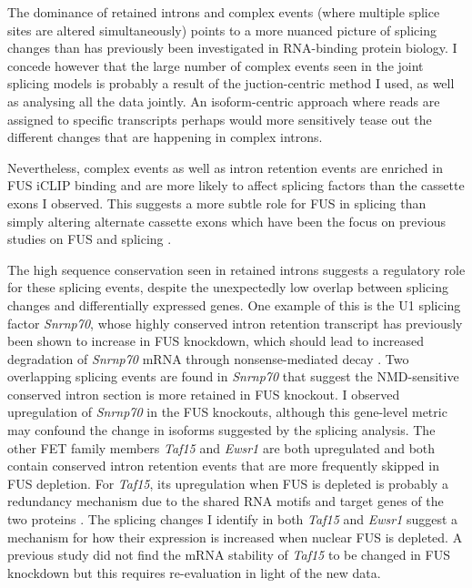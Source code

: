 The dominance of retained introns and complex events (where multiple splice sites are altered simultaneously) points to a more nuanced picture of splicing changes than has previously been investigated in RNA-binding protein biology.
I concede however that the large number of complex events seen in the joint splicing models is probably a result of the juction-centric method I used, as well as analysing all the data jointly. 
An isoform-centric approach where reads are assigned to specific transcripts \citep{Trapnell2010,Bray2016} perhaps would more sensitively tease out the different changes that are happening in complex introns.

Nevertheless, complex events as well as intron retention events are enriched in FUS iCLIP binding and are more likely to affect splicing factors than the cassette exons I observed. 
This suggests a more subtle role for FUS in splicing than simply altering alternate cassette exons which have been the focus on previous studies on FUS and splicing \citep{Rogelj2012,Lagier-Tourenne2012,Ishigaki2012,Honda2014,Scekic-zahirovic2016}.

The high sequence conservation seen in retained introns suggests a regulatory role for these splicing events, despite the unexpectedly low overlap between splicing changes and differentially expressed genes.
One example of this is the U1 splicing factor \textit{Snrnp70}, whose highly conserved intron retention transcript has previously been shown to increase in FUS knockdown, which should lead to increased degradation of \textit{Snrnp70} mRNA through nonsense-mediated decay \citep{Nakaya2013}. 
Two overlapping splicing events are found in \textit{Snrnp70} that suggest the NMD-sensitive conserved intron section is more retained in FUS knockout. 
I observed upregulation of \textit{Snrnp70} in the FUS knockouts, although this gene-level metric may confound the change in isoforms suggested by the splicing analysis. 
The other FET family members \textit{Taf15} and \textit{Ewsr1} are both upregulated and both contain conserved intron retention events that are more frequently skipped in FUS depletion.
For \textit{Taf15}, its upregulation when FUS is depleted is probably a redundancy mechanism due to the shared RNA motifs and target genes of the two proteins \citep{Ibrahim2013,Kapeli2016}. 
The splicing changes I identify in both \textit{Taf15} and \textit{Ewsr1} suggest a mechanism for how their expression is increased when  nuclear FUS is depleted.
A previous study did not find the mRNA stability of \textit{Taf15} to be changed in FUS knockdown \citep{Colombrita2012} but this requires re-evaluation in light of the new data.

